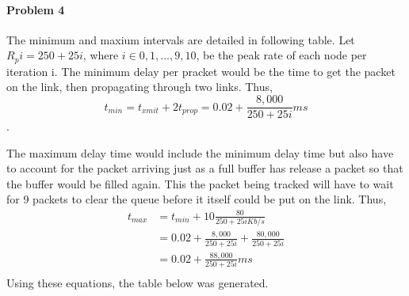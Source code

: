 \documentclass[12pt]{article}
\begin{document}
\paragraph{Problem 4}
The minimum and maxium intervals are detailed in following table. Let $R_pi  = 250 + 25i$, where $i\in {0, 1, ..., 9, 10}$, be the peak rate of each node per iteration i. The minimum delay per pracket would be the time to get the packet on the link, then propagating through two links. Thus, \\
$$t_{min} = t_{xmit} + 2t_{prop} = 0.02 + \frac{ 8,000 }{ 250 + 25i } ms$$.

The maximum delay time would include the minimum delay time but also have to account for the packet arriving just as a full buffer has release a packet so that the buffer would be filled again. This the packet being tracked will have to wait for 9 packets to clear the queue before it itself could be put on the link. Thus, \\
\begin{align}
t_{max} & = t_{min} + 10\frac{ 80 }{ 250 + 25i Kb/s }\\
& = 0.02 + \frac{ 8,000 }{ 250 + 25i } + \frac{ 80,000 }{ 250 + 25i } \\
& = 0.02 + \frac{ 88,000 }{ 250 + 25i } ms\\
\end{align}
Using these equations, the table below was generated. 
\end{document}
